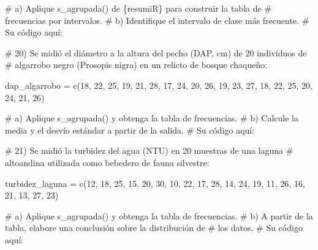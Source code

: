 \documentclass[
  spanish,
  letterpaper,
  DIV=11,
  numbers=noendperiod]{scrreprt}
\newenvironment{Shaded}{\begin{snugshade}}{\end{snugshade}}
\newcommand{\CommentTok}[1]{\textcolor[rgb]{0.37,0.37,0.37}{#1}}
\newcommand{\DecValTok}[1]{\textcolor[rgb]{0.68,0.00,0.00}{#1}}
\newcommand{\FunctionTok}[1]{\textcolor[rgb]{0.28,0.35,0.67}{#1}}
\newcommand{\NormalTok}[1]{\textcolor[rgb]{0.00,0.23,0.31}{#1}}
\newcommand{\OtherTok}[1]{\textcolor[rgb]{0.00,0.23,0.31}{#1}}
\begin{document}
\begin{Shaded}
\begin{Highlighting}[]
\CommentTok{\#     a) Aplique s\_agrupada() de \{resumiR\} para construir la tabla de}
\CommentTok{\#        frecuencias por intervalos.}
\CommentTok{\#     b) Identifique el intervalo de clase más frecuente.}
\CommentTok{\# Su código aquí:}


\CommentTok{\# 20) Se midió el diámetro a la altura del pecho (DAP, cm) de 20 individuos de}
\CommentTok{\#     algarrobo negro (Prosopis nigra) en un relicto de bosque chaqueño:}

\NormalTok{dap\_algarrobo }\OtherTok{=} \FunctionTok{c}\NormalTok{(}\DecValTok{18}\NormalTok{, }\DecValTok{22}\NormalTok{, }\DecValTok{25}\NormalTok{, }\DecValTok{19}\NormalTok{, }\DecValTok{21}\NormalTok{, }\DecValTok{28}\NormalTok{, }\DecValTok{17}\NormalTok{, }\DecValTok{24}\NormalTok{, }\DecValTok{20}\NormalTok{, }\DecValTok{26}\NormalTok{,}
                   \DecValTok{19}\NormalTok{, }\DecValTok{23}\NormalTok{, }\DecValTok{27}\NormalTok{, }\DecValTok{18}\NormalTok{, }\DecValTok{22}\NormalTok{, }\DecValTok{25}\NormalTok{, }\DecValTok{20}\NormalTok{, }\DecValTok{24}\NormalTok{, }\DecValTok{21}\NormalTok{, }\DecValTok{26}\NormalTok{)}

\CommentTok{\#     a) Aplique s\_agrupada() y obtenga la tabla de frecuencias.}
\CommentTok{\#     b) Calcule la media y el desvío estándar a partir de la salida.}
\CommentTok{\# Su código aquí:}


\CommentTok{\# 21) Se midió la turbidez del agua (NTU) en 20 muestras de una laguna}
\CommentTok{\#     altoandina utilizada como bebedero de fauna silvestre:}

\NormalTok{turbidez\_laguna }\OtherTok{=} \FunctionTok{c}\NormalTok{(}\DecValTok{12}\NormalTok{, }\DecValTok{18}\NormalTok{, }\DecValTok{25}\NormalTok{, }\DecValTok{15}\NormalTok{, }\DecValTok{20}\NormalTok{, }\DecValTok{30}\NormalTok{, }\DecValTok{10}\NormalTok{, }\DecValTok{22}\NormalTok{, }\DecValTok{17}\NormalTok{, }\DecValTok{28}\NormalTok{,}
                     \DecValTok{14}\NormalTok{, }\DecValTok{24}\NormalTok{, }\DecValTok{19}\NormalTok{, }\DecValTok{11}\NormalTok{, }\DecValTok{26}\NormalTok{, }\DecValTok{16}\NormalTok{, }\DecValTok{21}\NormalTok{, }\DecValTok{13}\NormalTok{, }\DecValTok{27}\NormalTok{, }\DecValTok{23}\NormalTok{)}

\CommentTok{\#     a) Aplique s\_agrupada() y obtenga la tabla de frecuencias.}
\CommentTok{\#     b) A partir de la tabla, elabore una conclusión sobre la distribución de}
\CommentTok{\#        los datos.}
\CommentTok{\# Su código aquí:}



\end{Highlighting}
\end{Shaded}
\end{document}
